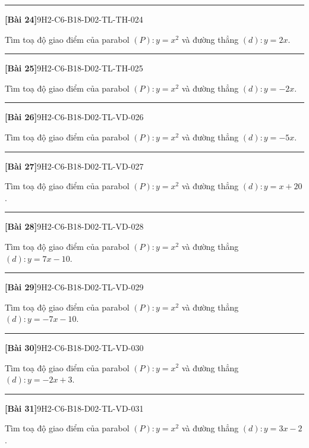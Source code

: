 \documentclass[12pt,a4paper]{article}
\newif\ifloigiai
\newenvironment{cauhoi}[2]{%
  \par\medskip\noindent\rule{\textwidth}{0.4pt}\par\nopagebreak
  \noindent\textbf{[#1]}\hfill{\scriptsize\ttfamily #2}\par\nopagebreak\smallskip}{\par}
\newcommand{\loigiai}[1]{\ifloigiai\par\smallskip\noindent\textit{Lời giải.} #1\par\fi}
\begin{document}
\begin{cauhoi}{Bài 24}{9H2-C6-B18-D02-TL-TH-024}
Tìm toạ độ giao điểm của parabol $(P): y=x^{2}$ và đường thẳng $(d): y=2x$.
\loigiai{Phương trình hoành độ giao điểm: $x^{2}=2x$ hay $x^{2}-2x+0=0$, có hai nghiệm $x=0$ và $x=2$. Giao điểm là $(0;0)$ và $(2;4)$.}
\end{cauhoi}
\begin{cauhoi}{Bài 25}{9H2-C6-B18-D02-TL-TH-025}
Tìm toạ độ giao điểm của parabol $(P): y=x^{2}$ và đường thẳng $(d): y=-2x$.
\loigiai{Phương trình hoành độ giao điểm: $x^{2}=-2x$ hay $x^{2}+2x+0=0$, có hai nghiệm $x=-2$ và $x=0$. Giao điểm là $(-2;4)$ và $(0;0)$.}
\end{cauhoi}
\begin{cauhoi}{Bài 26}{9H2-C6-B18-D02-TL-VD-026}
Tìm toạ độ giao điểm của parabol $(P): y=x^{2}$ và đường thẳng $(d): y=-5x$.
\loigiai{Phương trình hoành độ giao điểm: $x^{2}=-5x$ hay $x^{2}+5x+0=0$, có hai nghiệm $x=-5$ và $x=0$. Giao điểm là $(-5;25)$ và $(0;0)$.}
\end{cauhoi}
\begin{cauhoi}{Bài 27}{9H2-C6-B18-D02-TL-VD-027}
Tìm toạ độ giao điểm của parabol $(P): y=x^{2}$ và đường thẳng $(d): y=x+20$.
\loigiai{Phương trình hoành độ giao điểm: $x^{2}=x+20$ hay $x^{2}-x-20=0$, có hai nghiệm $x=-4$ và $x=5$. Giao điểm là $(-4;16)$ và $(5;25)$.}
\end{cauhoi}
\begin{cauhoi}{Bài 28}{9H2-C6-B18-D02-TL-VD-028}
Tìm toạ độ giao điểm của parabol $(P): y=x^{2}$ và đường thẳng $(d): y=7x-10$.
\loigiai{Phương trình hoành độ giao điểm: $x^{2}=7x-10$ hay $x^{2}-7x+10=0$, có hai nghiệm $x=2$ và $x=5$. Giao điểm là $(2;4)$ và $(5;25)$.}
\end{cauhoi}
\begin{cauhoi}{Bài 29}{9H2-C6-B18-D02-TL-VD-029}
Tìm toạ độ giao điểm của parabol $(P): y=x^{2}$ và đường thẳng $(d): y=-7x-10$.
\loigiai{Phương trình hoành độ giao điểm: $x^{2}=-7x-10$ hay $x^{2}+7x+10=0$, có hai nghiệm $x=-5$ và $x=-2$. Giao điểm là $(-5;25)$ và $(-2;4)$.}
\end{cauhoi}
\begin{cauhoi}{Bài 30}{9H2-C6-B18-D02-TL-VD-030}
Tìm toạ độ giao điểm của parabol $(P): y=x^{2}$ và đường thẳng $(d): y=-2x+3$.
\loigiai{Phương trình hoành độ giao điểm: $x^{2}=-2x+3$ hay $x^{2}+2x-3=0$, có hai nghiệm $x=-3$ và $x=1$. Giao điểm là $(-3;9)$ và $(1;1)$.}
\end{cauhoi}
\begin{cauhoi}{Bài 31}{9H2-C6-B18-D02-TL-VD-031}
Tìm toạ độ giao điểm của parabol $(P): y=x^{2}$ và đường thẳng $(d): y=3x-2$.
\loigiai{Phương trình hoành độ giao điểm: $x^{2}=3x-2$ hay $x^{2}-3x+2=0$, có hai nghiệm $x=1$ và $x=2$. Giao điểm là $(1;1)$ và $(2;4)$.}
\end{cauhoi}
\end{document}
